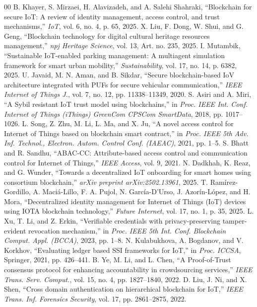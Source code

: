 \documentclass[conference]{IEEEtran}
\begin{document}
\begin{thebibliography}{00}
 B. Khayer, S. Mirzaei, H. Alavizadeh, and A. Salehi Shahraki, ``Blockchain for secure IoT: A review of identity management, access control, and trust mechanisms,'' \textit{IoT}, vol. 6, no. 4, p. 65, 2025.
 X. Liu, F. Dong, W. Shui, and G. Geng, ``Blockchain technology for digital cultural heritage resources management,'' \textit{npj Heritage Science}, vol. 13, Art. no. 235, 2025.
 I. Mutambik, ``Sustainable IoT-enabled parking management: A multiagent simulation framework for smart urban mobility,'' \textit{Sustainability}, vol. 17, no. 14, p. 6382, 2025.
 U. Javaid, M. N. Aman, and B. Sikdar, ``Secure blockchain-based IoV architecture integrated with PUFs for secure vehicular communication,'' \textit{IEEE Internet of Things J.}, vol. 7, no. 12, pp. 11338--11349, 2020.
 S. Asiri and A. Miri, ``A Sybil resistant IoT trust model using blockchains,'' in \textit{Proc. IEEE Int. Conf. Internet of Things (iThings) GreenCom CPSCom SmartData}, 2018, pp. 1017--1026.
 L. Song, Z. Zhu, M. Li, L. Ma, and X. Ju, ``A novel access control for Internet of Things based on blockchain smart contract,'' in \textit{Proc. IEEE 5th Adv. Inf. Technol., Electron. Autom. Control Conf. (IAEAC)}, 2021, pp. 1--5.
 S. Bhatt and R. Sandhu, ``ABAC-CC: Attribute-based access control and communication control for Internet of Things,'' \textit{IEEE Access}, vol. 9, 2021.
 N. Dadkhah, K. Reaz, and G. Wunder, ``Towards a decentralized IoT onboarding for smart homes using consortium blockchain,'' \textit{arXiv preprint arXiv:2502.13961}, 2025.
 T. Ramírez-Gordillo, A. Maciá-Lillo, F. A. Pujol, N. García-D'Urso, J. Azorín-López, and H. Mora, ``Decentralized identity management for Internet of Things (IoT) devices using IOTA blockchain technology,'' \textit{Future Internet}, vol. 17, no. 1, p. 35, 2025.
 L. Xu, T. Li, and Z. Erkin, ``Verifiable credentials with privacy-preserving tamper-evident revocation mechanism,'' in \textit{Proc. IEEE 5th Int. Conf. Blockchain Comput. Appl. (BCCA)}, 2023, pp. 1--8.
 N. Kulabukhova, A. Bogdanov, and V. Korkhov, ``Evaluating ledger based SSI frameworks for IoT,'' in \textit{Proc. ICCSA}, Springer, 2021, pp. 426--441.
 B. Ye, M. Li, and L. Chen, ``A Proof-of-Trust consensus protocol for enhancing accountability in crowdsourcing services,'' \textit{IEEE Trans. Serv. Comput.}, vol. 15, no. 4, pp. 1827--1840, 2022.
 D. Liu, J. Ni, and X. Shen, ``Cross domain authentication on hierarchical blockchain for IoT,'' \textit{IEEE Trans. Inf. Forensics Security}, vol. 17, pp. 2861--2875, 2022.

\end{thebibliography}
\end{document}
